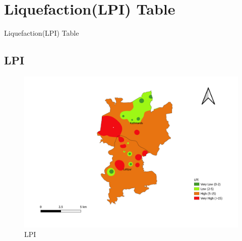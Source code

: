 \section{Liquefaction(LPI) Table}
\begin{table}[!h]
\caption{Liquefaction(LPI) Table}

\end{table}
\pagebreak

\begin{landscape}
\section{LPI}
\begin{figure}[!h]
\centering
\includegraphics[width=0.8\linewidth, height=0.8\textheight,keepaspectratio]{in/map/LPI.png}
\caption{LPI}
\end{figure}
\pagebreak
\end{landscape}

